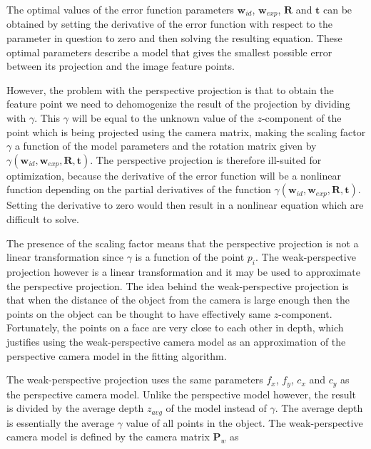 \documentclass[11pt,a4paper]{report}
\begin{document}
The optimal values of the error function parameters $\mathbf{w}_{id}$, $\mathbf{w}_{exp}$,
$\mathbf{R}$ and $\mathbf{t}$ can be obtained by setting the derivative of the
error function with respect to the parameter in question to zero and then
solving the resulting equation. These optimal parameters describe a model that
gives the smallest possible error between its projection and the image feature points.


However, the problem with the perspective projection is that to obtain the feature point
we need to dehomogenize the result of the projection by dividing with
$\gamma$. This $\gamma$ will be equal to the unknown value of the $z$-component of the point
which is being projected using the camera matrix, making the scaling factor $\gamma$ a function of the model parameters and the rotation
matrix given by $\gamma(\mathbf{w}_{id},\mathbf{w}_{exp},\mathbf{R},\mathbf{t})$. The
  perspective projection is therefore ill-suited for optimization, because the derivative of the error function will be
a nonlinear function depending on the partial derivatives of the function
$\gamma(\mathbf{w}_{id},\mathbf{w}_{exp},\mathbf{R},\mathbf{t})$. Setting the derivative to
  zero would then result in a nonlinear equation which are difficult to solve.

The presence of the scaling factor means that the perspective projection is not a linear transformation since $\gamma$ is a
function of the point $p_i$. The weak-perspective projection however is a linear
transformation and it may be used to approximate the perspective projection. The idea
behind the weak-perspective projection is that when the distance of the object
from the camera is large enough then the points on the object can be thought to have effectively same
$z$-component. Fortunately, the points on a face are very close to each other in depth, which justifies using the weak-perspective camera model as an approximation
of the perspective camera model in the fitting algorithm. 

The weak-perspective projection uses the same parameters $f_x$, $f_y$, $c_x$ and
$c_y$ as the perspective camera model. Unlike the perspective model however, the
result is divided by the average depth $z_{avg}$ of the model instead of
$\gamma$. The average depth is essentially the average $\gamma$ value of all points
in the object. The weak-perspective camera model is defined by the camera matrix
$\mathbf{P}_w$ as 
\end{document}
